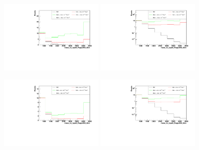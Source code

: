 \begin{figure}[h]
  \begin{center}
	\includegraphics[width=0.45\textwidth]{Plots/aQGC_kinematics/mass_lvj_type0_PuppiAK8_8bin_FM1.pdf}%
	\includegraphics[width=0.45\textwidth]{Plots/aQGC_kinematics/mass_lvj_type0_PuppiAK8_8bin_FM1_log.pdf}\\	
    \caption{}
  \end{center}
\end{figure}
\begin{figure}[h]
  \begin{center}
	\includegraphics[width=0.45\textwidth]{Plots/aQGC_kinematics/mass_lvj_type0_PuppiAK8_8bin_FM6.pdf}%
	\includegraphics[width=0.45\textwidth]{Plots/aQGC_kinematics/mass_lvj_type0_PuppiAK8_8bin_FM6_log.pdf}\\	
    \caption{}
  \end{center}
\end{figure}
